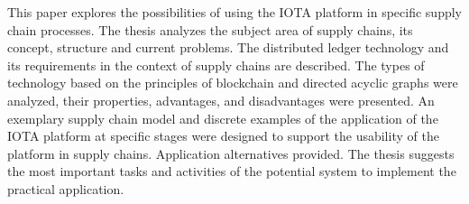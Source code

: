 

This paper explores the possibilities of using the IOTA platform in specific supply chain processes. The thesis analyzes the subject area of supply chains, its concept, structure and current problems. The distributed ledger technology and its requirements in the context of supply chains are described. The types of technology based on the principles of blockchain and directed acyclic graphs were analyzed, their properties, advantages, and disadvantages were presented. An exemplary supply chain model and discrete examples of the application of the IOTA platform at specific stages were designed to support the usability of the platform in supply chains. Application alternatives provided. The thesis suggests the most important tasks and activities of the potential system to implement the practical application.


